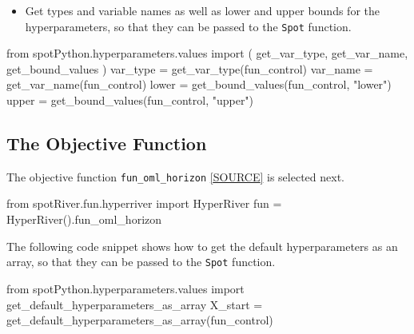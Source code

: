 \documentclass[
  letterpaper,
  DIV=11,
  numbers=noendperiod]{scrreprt}
\newenvironment{Shaded}{\begin{snugshade}}{\end{snugshade}}
\newcommand{\ImportTok}[1]{\textcolor[rgb]{0.00,0.46,0.62}{#1}}
\newcommand{\NormalTok}[1]{\textcolor[rgb]{0.00,0.23,0.31}{#1}}
\newcommand{\OperatorTok}[1]{\textcolor[rgb]{0.37,0.37,0.37}{#1}}
\newcommand{\StringTok}[1]{\textcolor[rgb]{0.13,0.47,0.30}{#1}}
\providecommand{\tightlist}{%
  \setlength{\itemsep}{0pt}\setlength{\parskip}{0pt}}\usepackage{longtable,booktabs,array}
\begin{document}
\begin{itemize}
\tightlist
\item
  Get types and variable names as well as lower and upper bounds for the
  hyperparameters, so that they can be passed to the \texttt{Spot}
  function.
\end{itemize}

\begin{Shaded}
\begin{Highlighting}[]
\ImportTok{from}\NormalTok{ spotPython.hyperparameters.values }\ImportTok{import}\NormalTok{ (}
\NormalTok{    get\_var\_type,}
\NormalTok{    get\_var\_name,}
\NormalTok{    get\_bound\_values}
\NormalTok{    )}
\NormalTok{var\_type }\OperatorTok{=}\NormalTok{ get\_var\_type(fun\_control)}
\NormalTok{var\_name }\OperatorTok{=}\NormalTok{ get\_var\_name(fun\_control)}
\NormalTok{lower }\OperatorTok{=}\NormalTok{ get\_bound\_values(fun\_control, }\StringTok{"lower"}\NormalTok{)}
\NormalTok{upper }\OperatorTok{=}\NormalTok{ get\_bound\_values(fun\_control, }\StringTok{"upper"}\NormalTok{)}
\end{Highlighting}
\end{Shaded}

\hypertarget{sec-the-objective-function-13}{%
\subsection{The Objective
Function}\label{sec-the-objective-function-13}}

The objective function \texttt{fun\_oml\_horizon}
\href{https://github.com/sequential-parameter-optimization/spotRiver/blob/main/src/spotRiver/fun/hyperriver.py}{{[}SOURCE{]}}
is selected next.

\begin{Shaded}
\begin{Highlighting}[]
\ImportTok{from}\NormalTok{ spotRiver.fun.hyperriver }\ImportTok{import}\NormalTok{ HyperRiver}
\NormalTok{fun }\OperatorTok{=}\NormalTok{ HyperRiver().fun\_oml\_horizon}
\end{Highlighting}
\end{Shaded}

The following code snippet shows how to get the default hyperparameters
as an array, so that they can be passed to the \texttt{Spot} function.

\begin{Shaded}
\begin{Highlighting}[]
\ImportTok{from}\NormalTok{ spotPython.hyperparameters.values }\ImportTok{import}\NormalTok{ get\_default\_hyperparameters\_as\_array}
\NormalTok{X\_start }\OperatorTok{=}\NormalTok{ get\_default\_hyperparameters\_as\_array(fun\_control)}
\end{Highlighting}
\end{Shaded}
\end{document}
